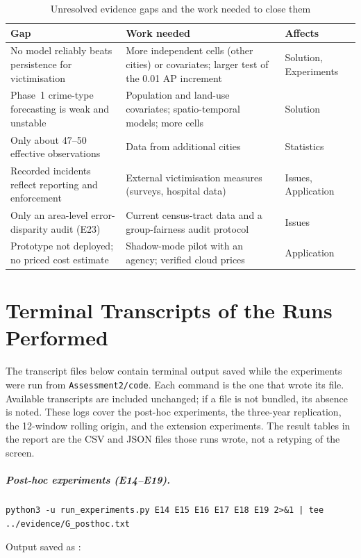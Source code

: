 \documentclass[11pt,a4paper]{report}
\begin{document}
\begin{table}[H]
\centering\scriptsize
\caption{Unresolved evidence gaps and the work needed to close them}
\label{tab:gaps}
\begin{tabularx}{\textwidth}{@{}L{3.7cm} Y L{2.6cm}@{}}
\toprule
Gap & Work needed & Affects\\
\midrule
No model reliably beats persistence for victimisation & More independent cells (other cities) or covariates; larger test of the 0.01 AP increment & Solution, Experiments\\
Phase~1 crime-type forecasting is weak and unstable & Population and land-use covariates; spatio-temporal models; more cells & Solution\\
Only about 47--50 effective observations & Data from additional cities & Statistics\\
Recorded incidents reflect reporting and enforcement & External victimisation measures (surveys, hospital data) & Issues, Application\\
Only an area-level error-disparity audit (E23) & Current census-tract data and a group-fairness audit protocol & Issues\\
Prototype not deployed; no priced cost estimate & Shadow-mode pilot with an agency; verified cloud prices & Application\\
\bottomrule
\end{tabularx}
\end{table}

\chapter{Terminal Transcripts of the Runs Performed}
\label{app:logs}
The transcript files below contain terminal output saved while the experiments were run from \texttt{Assessment2/code}. Each command is the one that wrote its file. Available transcripts are included unchanged; if a file is not bundled, its absence is noted. These logs cover the post-hoc experiments, the three-year replication, the 12-window rolling origin, and the extension experiments. The result tables in the report are the CSV and JSON files those runs wrote, not a retyping of the screen.

\paragraph{Post-hoc experiments (E14--E19).}
\begin{Verbatim}[fontsize=\scriptsize,breaklines,breakanywhere]
python3 -u run_experiments.py E14 E15 E16 E17 E18 E19 2>&1 | tee ../evidence/G_posthoc.txt
\end{Verbatim}
\noindent Output saved as :
\end{document}
